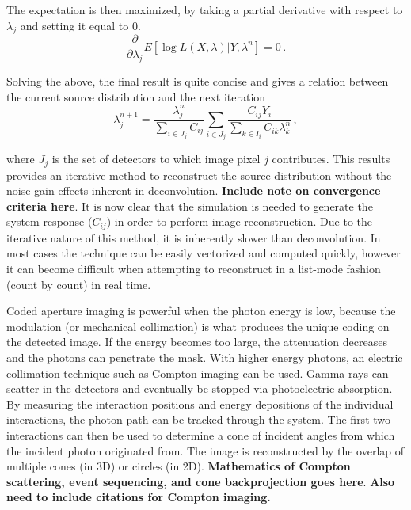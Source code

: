 \documentclass[10pt]{article}
\begin{document}
\noindent The expectation is then maximized, by taking a partial derivative with respect to $\lambda_j$ and setting it equal to 0.
 \begin{equation}
	\frac{\partial}{\partial \lambda_j} E[\log L(X,\lambda) | Y,\lambda^n] = 0\,.
\end{equation}

\noindent Solving the above, the final result is quite concise and gives a relation between the current source distribution and the next iteration
%
 \begin{equation}
	\lambda_j^{n+1} = \frac{\lambda_j^n}{\sum\limits_{i \in J_j}C_{ij}} \sum_{i \in J_j} \frac{C_{ij}Y_i}{\sum\limits_{k \in I_i}C_{ik}\lambda_k^n}\,,
\end{equation}

\noindent where $J_j$ is the set of detectors to which image pixel $j$ contributes. This results provides an iterative method to reconstruct the source distribution without the noise gain effects inherent in deconvolution. \textbf{Include note on convergence criteria here}. It is now clear that the simulation is needed to generate the system response ($C_{ij}$) in order to perform image reconstruction. Due to the iterative nature of this method, it is inherently slower than deconvolution. In most cases the technique can be easily vectorized and computed quickly, however it can become difficult when attempting to reconstruct in a list-mode fashion (count by count) in real time.

Coded aperture imaging is powerful when the photon energy is low, because the modulation (or mechanical collimation) is what produces the unique coding on the detected image. If the energy becomes too large, the attenuation decreases and the photons can penetrate the mask. With higher energy photons, an electric collimation technique such as Compton imaging can be used. Gamma-rays can scatter in the detectors and eventually be stopped via photoelectric absorption. By measuring the interaction positions and energy depositions of the individual interactions, the photon path can be tracked through the system. The first two interactions can then be used to determine a cone of incident angles from which the incident photon originated from. The image is reconstructed by the overlap of multiple cones (in 3D) or circles (in 2D). \textbf{Mathematics of Compton scattering, event sequencing, and cone backprojection goes here}. \textbf{Also need to include citations for Compton imaging.}
\end{document}
